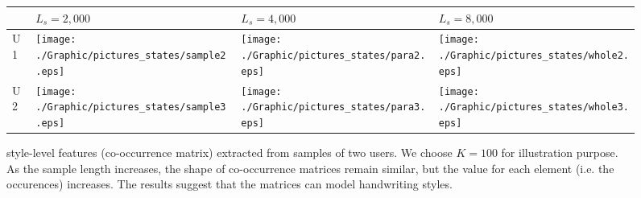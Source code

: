  \begin{figure}[!t]
 \vspace{-0mm}
 \scriptsize
 \centering
     \begin{tabular}{ m{0.2cm}  m{2.2cm} m{2.2cm} m{2.2cm} }
     \hline
   	   & \textbf{$L_s = 2,000$} & \textbf{$L_s = 4,000$} & \textbf{$L_s = 8,000$} \tabularnewline \hline \hline
     	U1
    & {\texttt{[image: ./Graphic/pictures\_states/sample2.eps]}}
    & {\texttt{[image: ./Graphic/pictures\_states/para2.eps]}}
	& {\texttt{[image: ./Graphic/pictures\_states/whole2.eps]}}\tabularnewline \hline
		U2
    & {\texttt{[image: ./Graphic/pictures\_states/sample3.eps]}}
    & {\texttt{[image: ./Graphic/pictures\_states/para3.eps]}}
	& {\texttt{[image: ./Graphic/pictures\_states/whole3.eps]}}\tabularnewline \hline
\end{tabular}
\vspace{-0mm}
\caption {{style-level features (co-occurrence matrix) extracted from samples of two users. We choose $K=100$ for illustration purpose.
 As the sample length increases, the shape of co-occurrence matrices remain similar, but the value for each element (i.e. the occurences) increases. The results suggest that the matrices can model handwriting styles.
 }\vspace{-2mm}}\label{tab:sample-para-whole}
\end{figure}


 


